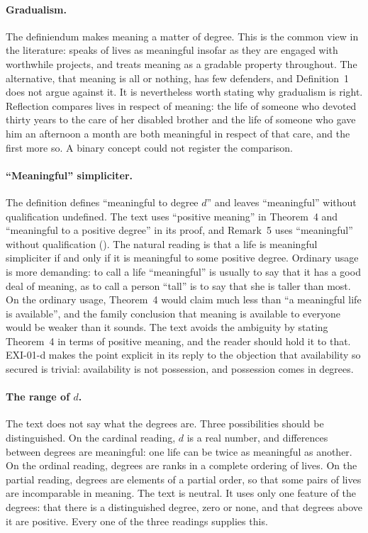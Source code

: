 \paragraph{Gradualism.} The definiendum makes meaning a matter of degree. This is the common view in the literature: \citet{Wolf1997} speaks of lives as meaningful insofar as they are engaged with worthwhile projects, and \citet{Metz2013} treats meaning as a gradable property throughout. The alternative, that meaning is all or nothing, has few defenders, and Definition~1 does not argue against it. It is nevertheless worth stating why gradualism is right. Reflection compares lives in respect of meaning: the life of someone who devoted thirty years to the care of her disabled brother and the life of someone who gave him an afternoon a month are both meaningful in respect of that care, and the first more so. A binary concept could not register the comparison.

\paragraph{\enquote{Meaningful} simpliciter.} The definition defines \enquote{meaningful to degree $d$} and leaves \enquote{meaningful} without qualification undefined. The text uses \enquote{positive meaning} in Theorem~4 and \enquote{meaningful to a positive degree} in its proof, and Remark~5 uses \enquote{meaningful} without qualification (). The natural reading is that a life is meaningful simpliciter if and only if it is meaningful to some positive degree. Ordinary usage is more demanding: to call a life \enquote{meaningful} is usually to say that it has a good deal of meaning, as to call a person \enquote{tall} is to say that she is taller than most. On the ordinary usage, Theorem~4 would claim much less than \enquote{a meaningful life is available}, and the family conclusion that meaning is available to everyone would be weaker than it sounds. The text avoids the ambiguity by stating Theorem~4 in terms of positive meaning, and the reader should hold it to that. EXI-01-d makes the point explicit in its reply to the objection that availability so secured is trivial: availability is not possession, and possession comes in degrees.

\paragraph{The range of $d$.} The text does not say what the degrees are. Three possibilities should be distinguished. On the cardinal reading, $d$ is a real number, and differences between degrees are meaningful: one life can be twice as meaningful as another. On the ordinal reading, degrees are ranks in a complete ordering of lives. On the partial reading, degrees are elements of a partial order, so that some pairs of lives are incomparable in meaning. The text is neutral. It uses only one feature of the degrees: that there is a distinguished degree, zero or none, and that degrees above it are positive. Every one of the three readings supplies this.

